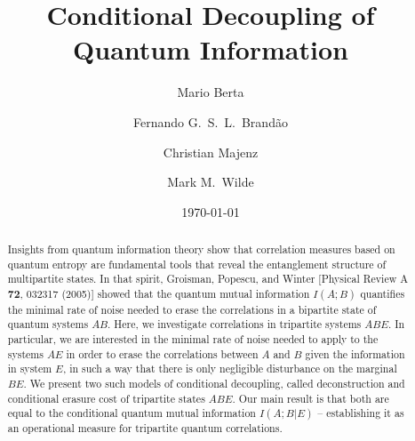 \documentclass[a4paper,aps,prl,twocolumn,10pt,superscriptaddress]{revtex4-1}
\theoremstyle{plain}
\theoremstyle{definition}
\begin{document}
\title{Conditional Decoupling of Quantum Information}
\date{\today}

\author{Mario Berta}
\author{Fernando G.~S.~L.~Brand\~{a}o}

\author{Christian Majenz}

\author{Mark M.~Wilde}

\begin{abstract}
Insights from quantum information theory show that correlation measures based on quantum entropy are fundamental tools that reveal the entanglement structure of multipartite states. In that spirit, Groisman, Popescu, and Winter [Physical Review A \textbf{72}, 032317 (2005)] showed that the quantum mutual information $I(A;B)$ quantifies the minimal rate of noise needed to erase the correlations in a bipartite state of quantum systems $AB$. Here, we investigate correlations in tripartite systems $ABE$. In particular, we are interested in the minimal rate of noise needed to apply to the systems $AE$ in order to erase the correlations between $A$ and $B$ given the information in system $E$, in such a way that there is only negligible disturbance on the marginal $BE$. We present two such models of conditional decoupling, called deconstruction and conditional erasure cost of tripartite states $ABE$. Our main result is that both are equal to the conditional quantum mutual information $I(A;B|E)$ -- establishing it as an operational measure for tripartite quantum correlations.
\end{abstract}

\maketitle

\end{document}
